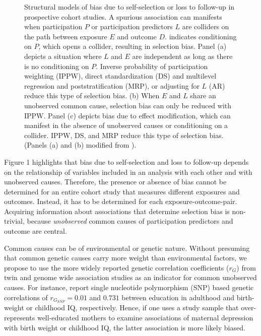 \documentclass[12pt]{article}
\newcommand*\circled[1]{\tikz[baseline=(char.base)]{
		\node[shape=circle,draw,inner sep=2pt] (char) {#1};}}
\begin{document}
\begin{figure}[h]
	\centering
	\caption{Structural models of bias due to self-selection or loss to follow-up in prospective cohort studies. A spurious association can manifests when participation $P$ or participation predictors $L$ are colliders on the path between exposure $E$ and outcome $D$. \protect\circled{$P$} indicates conditioning on $P$, which opens a collider, resulting in selection bias. Panel (a) depicts a situation where $L$ and $E$ are independent as long as there is no conditioning on $P$. Inverse probability of participation weighting (IPPW), direct standardization (DS) and multilevel regression and poststratification (MRP), or adjusting for $L$ (AR) reduce this type of selection bias. (b) When $E$ and $L$ share an unobserved common cause, selection bias can only be reduced with IPPW. Panel (c) depicts bias due to effect modification, which can manifest in the absence of unobserved causes or conditioning on a collider. IPPW, DS, and MRP reduce this type of selection bias. (Panels (a) and (b) modified from \cite{Hernan2004-oz}).}
	\label{fig:SelectionBias}
\end{figure}


Figure 1 highlights that bias due to self-selection and loss to follow-up depends on the relationship of variables included in an analysis with each other and with unobserved causes. Therefore, the presence or absence of bias cannot be determined for an entire cohort study that measures different exposures and outcomes. Instead, it has to be determined for each exposure-outcome-pair. Acquiring information about associations that determine selection bias is non-trivial, because \emph{unobserved} common causes of participation predictors and outcome are central. 

Common causes can be of environmental \cite{Johnson2011-wi,Verweij2013-xk} or genetic nature. Without presuming  that common genetic causes carry more weight than environmental factors, we propose to use the more widely reported genetic correlation coefficients ($r_G$) from twin \cite{Tambs2012-km} and genome wide association studies \cite{Bulik-Sullivan2015-er} as an indicator for common unobserved causes. For instance, \citeauthor{Bulik-Sullivan2015-xn} \cite{Bulik-Sullivan2015-xn} report single nucleotide polymorphism (SNP) based genetic correlations of $r_{G_{SNP}}=0.01$ and $0.731$ between education in adulthood and birth-weight or childhood IQ, respectively. Hence, if one uses a study sample that over-represents well-educated mothers to examine associations of maternal depression with birth weight or childhood IQ, the latter association is more likely biased.
\end{document}
